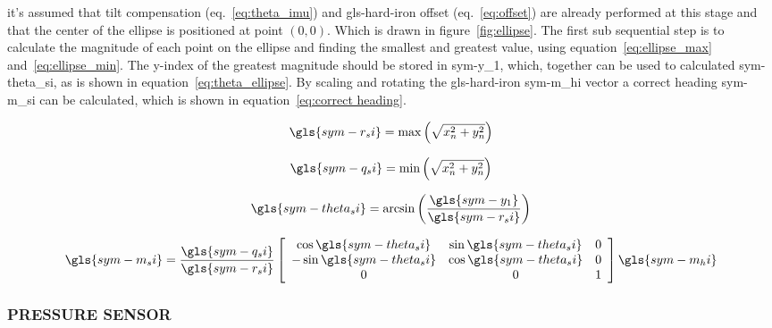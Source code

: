 it's assumed that tilt compensation (eq.~\ref{eq:theta_imu}) and \gls{gls-hard-iron} offset (eq.~\ref{eq:offset}) are
already performed at this stage and that the center of the ellipse is positioned at point \( (0,0) \). Which is drawn in
figure~\ref{fig:ellipse}. The first sub sequential step is to calculate the magnitude of each point on the ellipse and
finding the smallest and greatest value, using equation~\ref{eq:ellipse_max} and~\ref{eq:ellipse_min}. The y-index of
the greatest magnitude should be stored in \gls{sym-y_1}, which, together can be used to calculated \gls{sym-theta_si},
as is shown in equation~\ref{eq:theta_ellipse}. By scaling and rotating the \gls{gls-hard-iron} \gls{sym-m_hi} vector a
correct heading \gls{sym-m_si} can be calculated, which is shown in equation~\ref{eq:correct heading}.

\begin{equation}
    \label{eq:ellipse_max}
    \gls{sym-r_si} = \max \left(\sqrt{x_n^2 + y_n^2}\right)
\end{equation}

\begin{equation}
    \label{eq:ellipse_min}
    \gls{sym-q_si} = \min \left(\sqrt{x_n^2 + y_n^2}\right)
\end{equation}

\begin{equation}
    \label{eq:theta_ellipse}
    \gls{sym-theta_si} = \arcsin\left(\frac{\gls{sym-y_1}}{\gls{sym-r_si}}\right)
\end{equation}

\begin{equation}
    \label{eq:correct heading}
    \gls{sym-m_si} = \frac{\gls{sym-q_si}}{\gls{sym-r_si}} \left[\begin{array}{ccc}
                                                                     \cos \gls{sym-theta_si}  & \sin 
																	 \gls{sym-theta_si} & 0 \\
                                                                     -\sin \gls{sym-theta_si} & \cos 
																	 \gls{sym-theta_si} & 0 \\
                                                                     0                        & 0                    
																	 & 1
    \end{array}\right] \gls{sym-m_hi}
\end{equation}

\subsubsection{PRESSURE SENSOR}\label{sec:pressure sensor}

